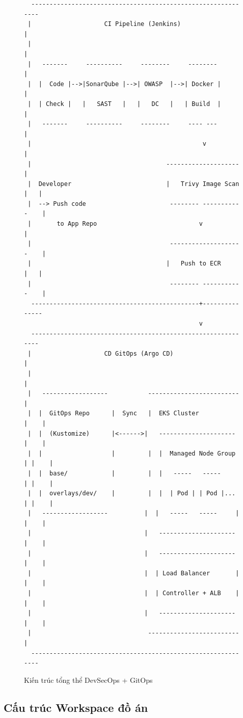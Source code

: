 \documentclass[13pt,a4paper,twoside]{extarticle}
\begin{document}
\begin{figure}[H]
\centering
\begin{verbatim}
  ------------------------------------------------------------- 
 |                    CI Pipeline (Jenkins)                     |
 |                                                             |
 |   -------     ----------     --------     --------         |
 |  |  Code |-->|SonarQube |-->| OWASP  |-->| Docker |        |
 |  | Check |   |   SAST   |   |   DC   |   | Build  |        |
 |   -------     ----------     --------     ---- ---         |
 |                                               v             |
 |                                     --------------------    |
 |  Developer                          |   Trivy Image Scan |   |
 |  --> Push code                       -------- -----------    |
 |       to App Repo                            v               |
 |                                      --------------------    |
 |                                     |   Push to ECR      |   |
 |                                      -------- -----------    |
  ----------------------------------------------+--------------- 
                                                v
  ------------------------------------------------------------- 
 |                    CD GitOps (Argo CD)                       |
 |                                                             |
 |   ------------------           -------------------------     |
 |  |  GitOps Repo      |  Sync   |  EKS Cluster             |    |
 |  |  (Kustomize)      |<------>|   ---------------------  |    |
 |  |                   |         |  |  Managed Node Group  | |    |
 |  |  base/            |         |  |   -----   -----     | |    |
 |  |  overlays/dev/    |         |  |  | Pod | | Pod |... | |    |
 |   ------------------          |  |   -----   -----     | |    |
 |                               |   ---------------------  |    |
 |                               |   ---------------------  |    |
 |                               |  | Load Balancer       | |    |
 |                               |  | Controller + ALB    | |    |
 |                               |   ---------------------  |    |
 |                                -------------------------     |
  ------------------------------------------------------------- 
\end{verbatim}
\caption{Kiến trúc tổng thể DevSecOps + GitOps}
\label{fig:architecture}
\end{figure}

\subsection{Cấu trúc Workspace đồ án}
\end{document}
